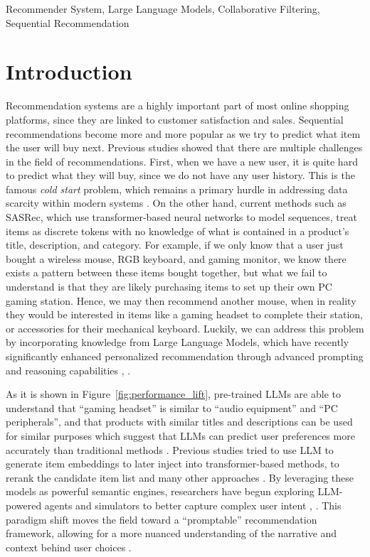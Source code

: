 \documentclass[conference]{IEEEtran}
\begin{document}
\begin{IEEEkeywords}
Recommender System, Large Language Models, Collaborative Filtering, Sequential Recommendation
\end{IEEEkeywords}

\section{Introduction}

Recommendation systems are a highly important part of most online shopping platforms, since they are linked to customer satisfaction and sales. Sequential recommendations become more and more popular as we try to predict what item the user will buy next. Previous studies showed that there are multiple challenges in the field of recommendations. First, when we have a new user, it is quite hard to predict what they will buy, since we do not have any user history. This is the famous \textit{cold start} problem, which remains a primary hurdle in addressing data scarcity within modern systems  \cite{b17}. On the other hand, current methods such as SASRec, which use transformer-based neural networks to model sequences, treat items as discrete tokens with no knowledge of what is contained in a product's title, description, and category. For example, if we only know that a user just bought a wireless mouse, RGB keyboard, and gaming monitor, we know there exists a pattern between these items bought together, but what we fail to understand is that they are likely purchasing items to set up their own PC gaming station. Hence, we may then recommend another mouse, when in reality they would be interested in items like a gaming headset to complete their station, or accessories for their mechanical keyboard. Luckily, we can address this problem by incorporating knowledge from Large Language Models, which have recently significantly enhanced personalized recommendation through advanced prompting and reasoning capabilities \cite{b3}, \cite{b4}.

As it is shown in Figure~\ref{fig:performance_lift}, pre-trained LLMs are able to understand that ``gaming headset'' is similar to ``audio equipment'' and ``PC peripherals'', and that products with similar titles and descriptions can be used for similar purposes which suggest that LLMs can predict user preferences more accurately than traditional methods \cite{b11}. Previous studies tried to use LLM to generate item embeddings to later inject into transformer-based methods, to rerank the candidate item list and many other approaches \cite{b6}. By leveraging these models as powerful semantic engines, researchers have begun exploring LLM-powered agents and simulators to better capture complex user intent \cite{b5}, \cite{b7}. This paradigm shift moves the field toward a ``promptable'' recommendation framework, allowing for a more nuanced understanding of the narrative and context behind user choices \cite{b14}.
\end{document}
